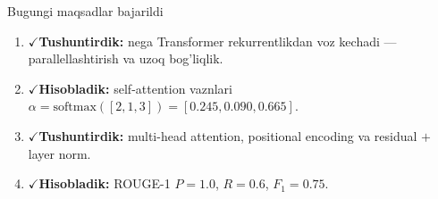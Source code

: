 \documentclass[aspectratio=169,11pt]{beamer}
\newcommand{\bajarildi}{{\color{deepgreen}\large$\checkmark$}\;}
\begin{document}
\begin{frame}{Bugungi maqsadlar bajarildi}
  \begin{enumerate}\setlength\itemsep{7pt}
    \item \bajarildi \textbf{Tushuntirdik:} nega Transformer rekurrentlikdan voz
          kechadi --- parallellashtirish va uzoq bog'liqlik.
    \item \bajarildi \textbf{Hisobladik:} self-attention vaznlari
          $\alpha=\mathrm{softmax}([2,1,3])=[0.245,0.090,0.665]$.
    \item \bajarildi \textbf{Tushuntirdik:} multi-head attention, positional
          encoding va residual $+$ layer norm.
    \item \bajarildi \textbf{Hisobladik:} ROUGE-1 $P=1.0$, $R=0.6$, $F_1=0.75$.
  \end{enumerate}
\end{frame}
\end{document}
